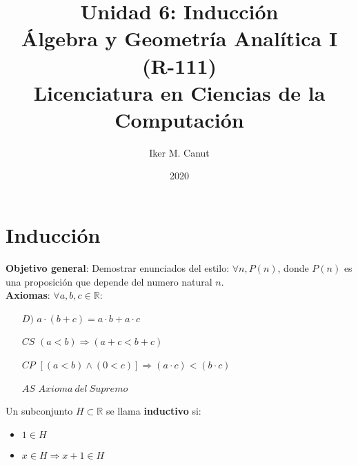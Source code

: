 \documentclass[11pt,a4paper]{article}
\author{Iker M. Canut}
\title{Unidad 6: Inducci\'on\\\'Algebra y Geometr\'ia Anal\'itica I (R-111)\\Licenciatura en Ciencias de la Computaci\'on}
\date{2020}
\begin{document}
\maketitle
\newpage
\section{Inducci\'on}
\noindent \textbf{Objetivo general}: Demostrar enunciados del estilo: $\forall n, P(n)$, donde $P(n)$ es una proposici\'on que depende del numero natural $n$.\\

\noindent \textbf{Axiomas}: $\forall a,b,c \in \mathbb{R}$:
\begin{enumerate}
\item [$D)$] $a \cdot (b + c) = a \cdot b + a \cdot c$
\item [$CS$] $(a < b) \Rightarrow (a+c < b+c)$
\item [$CP$] $[(a < b) \land (0 < c)] \Rightarrow (a \cdot c) < (b \cdot c)$
\item [$AS$] $Axioma\ del\ Supremo$
\end{enumerate}

\vspace{.8cm}

\noindent Un subconjunto $H \subset \mathbb{R}$ se llama \textbf{inductivo} si:
\begin{itemize}
\item $1 \in H$
\item $x \in H \Rightarrow x+1 \in H$\\
\end{itemize}
\end{document}
